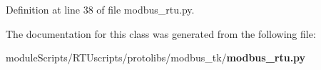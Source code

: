 Definition at line 38 of file modbus\+\_\+rtu.\+py.



The documentation for this class was generated from the following file\+:\begin{DoxyCompactItemize}
\item 
module\+Scripts/\+R\+T\+Uscripts/protolibs/modbus\+\_\+tk/{\bf modbus\+\_\+rtu.\+py}\end{DoxyCompactItemize}

